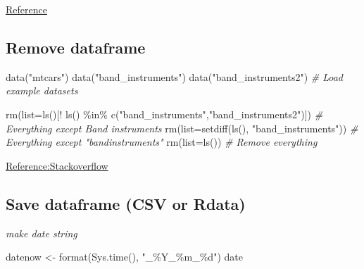 \documentclass[
]{article}
\newenvironment{Shaded}{\begin{snugshade}}{\end{snugshade}}
\newcommand{\AttributeTok}[1]{\textcolor[rgb]{0.77,0.63,0.00}{#1}}
\newcommand{\CommentTok}[1]{\textcolor[rgb]{0.56,0.35,0.01}{\textit{#1}}}
\newcommand{\FunctionTok}[1]{\textcolor[rgb]{0.00,0.00,0.00}{#1}}
\newcommand{\NormalTok}[1]{#1}
\newcommand{\OtherTok}[1]{\textcolor[rgb]{0.56,0.35,0.01}{#1}}
\newcommand{\SpecialCharTok}[1]{\textcolor[rgb]{0.00,0.00,0.00}{#1}}
\newcommand{\StringTok}[1]{\textcolor[rgb]{0.31,0.60,0.02}{#1}}
\begin{document}
\href{https://cran.r-project.org/web/packages/janitor/vignettes/janitor.html}{Reference}

\hypertarget{remove-dataframe}{%
\subsection{Remove dataframe}\label{remove-dataframe}}

\begin{Shaded}
\begin{Highlighting}[]
\FunctionTok{data}\NormalTok{(}\StringTok{"mtcars"}\NormalTok{)}
\FunctionTok{data}\NormalTok{(}\StringTok{"band\_instruments"}\NormalTok{)}
\FunctionTok{data}\NormalTok{(}\StringTok{"band\_instruments2"}\NormalTok{) }\CommentTok{\# Load example datasets}

\FunctionTok{rm}\NormalTok{(}\AttributeTok{list=}\FunctionTok{ls}\NormalTok{()[}\SpecialCharTok{!} \FunctionTok{ls}\NormalTok{() }\SpecialCharTok{\%in\%} \FunctionTok{c}\NormalTok{(}\StringTok{"band\_instruments"}\NormalTok{,}\StringTok{"band\_instruments2"}\NormalTok{)]) }
\CommentTok{\# Everything except Band instruments}
\FunctionTok{rm}\NormalTok{(}\AttributeTok{list=}\FunctionTok{setdiff}\NormalTok{(}\FunctionTok{ls}\NormalTok{(), }\StringTok{"band\_instruments"}\NormalTok{)) }\CommentTok{\# Everything except "bandinstruments"}
\FunctionTok{rm}\NormalTok{(}\AttributeTok{list=}\FunctionTok{ls}\NormalTok{()) }\CommentTok{\# Remove everything}
\end{Highlighting}
\end{Shaded}

\href{https://stackoverflow.com/questions/6190051/how-can-i-remove-all-objects-but-one-from-the-workspace-in-r}{Reference:Stackoverflow}

\hypertarget{save-dataframe-csv-or-rdata}{%
\subsection{Save dataframe (CSV or Rdata)}\label{save-dataframe-csv-or-rdata}}

\emph{make date string}

\begin{Shaded}
\begin{Highlighting}[]
\NormalTok{datenow }\OtherTok{\textless{}{-}} \FunctionTok{format}\NormalTok{(}\FunctionTok{Sys.time}\NormalTok{(), }\StringTok{"\_\%Y\_\%m\_\%d"}\NormalTok{)}
\NormalTok{date}
\end{Highlighting}
\end{Shaded}
\end{document}
